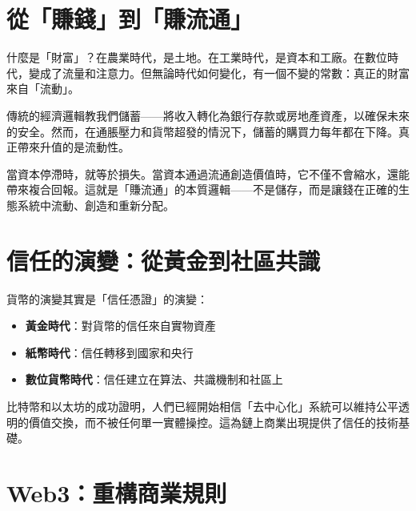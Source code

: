 \documentclass[
  Letterpaper,
]{scrbook}
\providecommand{\tightlist}{%
  \setlength{\itemsep}{0pt}\setlength{\parskip}{0pt}}
\begin{document}
\section*{從「賺錢」到「賺流通」}\label{ux5f9eux8cfaux9322ux5230ux8cfaux6d41ux901a}


什麼是「財富」？在農業時代，是土地。在工業時代，是資本和工廠。在數位時代，變成了流量和注意力。但無論時代如何變化，有一個不變的常數：真正的財富來自「流動」。

傳統的經濟邏輯教我們儲蓄------將收入轉化為銀行存款或房地產資產，以確保未來的安全。然而，在通脹壓力和貨幣超發的情況下，儲蓄的購買力每年都在下降。真正帶來升值的是流動性。

當資本停滯時，就等於損失。當資本通過流通創造價值時，它不僅不會縮水，還能帶來複合回報。這就是「賺流通」的本質邏輯------不是儲存，而是讓錢在正確的生態系統中流動、創造和重新分配。

\section*{信任的演變：從黃金到社區共識}\label{ux4fe1ux4efbux7684ux6f14ux8b8aux5f9eux9ec3ux91d1ux5230ux793eux5340ux5171ux8b58}


貨幣的演變其實是「信任憑證」的演變：

\begin{itemize}
\tightlist
\item
  \textbf{黃金時代}：對貨幣的信任來自實物資產
\item
  \textbf{紙幣時代}：信任轉移到國家和央行
\item
  \textbf{數位貨幣時代}：信任建立在算法、共識機制和社區上
\end{itemize}

比特幣和以太坊的成功證明，人們已經開始相信「去中心化」系統可以維持公平透明的價值交換，而不被任何單一實體操控。這為鏈上商業出現提供了信任的技術基礎。

\section*{Web3：重構商業規則}\label{web3ux91cdux69cbux5546ux696dux898fux5247}

\end{document}
